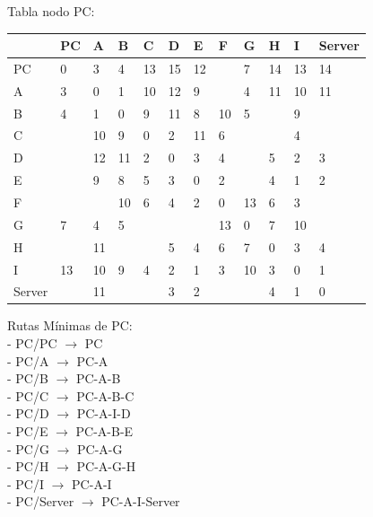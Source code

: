 \documentclass[a4paper]{article}
\begin{document}
\begin{table}[ht]
Tabla nodo PC:\\
\begin{tabular}{|l|l|l|l|l|l|l|l|l|l|l|l|}
\hline
       & PC & A  & B & C & D & E & F & G & H & I  & Server \\ \hline
PC     & 0  & 3  & 4 & 13& 15& 12&   & 7 & 14& 13 & 14     \\ \hline
A      & 3  & 0  & 1 & 10& 12& 9 &   & 4 & 11& 10 & 11     \\ \hline
B      & 4  & 1  & 0 & 9 & 11& 8 & 10& 5 &   & 9  &        \\ \hline
C      &    & 10 & 9 & 0 & 2 & 11& 6 &   &   & 4  &        \\ \hline
D      &    & 12 & 11& 2 & 0 & 3 & 4 &   & 5 & 2  & 3      \\ \hline
E      &    & 9  & 8 & 5 & 3 & 0 & 2 &   & 4 & 1  & 2      \\ \hline
F      &    &    & 10& 6 & 4 & 2 & 0 & 13& 6 & 3  &        \\ \hline
G      & 7  & 4  & 5 &   &   &   & 13& 0 & 7 & 10 &        \\ \hline
H      &    & 11 &   &   & 5 & 4 & 6 & 7 & 0 & 3  & 4      \\ \hline
I      & 13 & 10 & 9 & 4 & 2 & 1 & 3 & 10& 3 & 0  & 1      \\ \hline
Server &    & 11 &   &   & 3 & 2 &   &   & 4 & 1  & 0      \\ \hline
\end{tabular}

Rutas Mínimas de PC:\\
-	PC/PC $\rightarrow$  PC\\
-	PC/A  $\rightarrow$  PC-A\\
-	PC/B  $\rightarrow$  PC-A-B\\
-	PC/C  $\rightarrow$  PC-A-B-C\\
-	PC/D  $\rightarrow$  PC-A-I-D\\
-	PC/E  $\rightarrow$  PC-A-B-E\\
-	PC/G  $\rightarrow$  PC-A-G\\
-	PC/H  $\rightarrow$  PC-A-G-H\\
-	PC/I  $\rightarrow$  PC-A-I\\
-	PC/Server  $\rightarrow$  PC-A-I-Server\\
\end{table}



\clearpage
\end{document}
